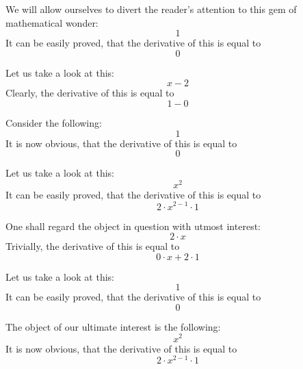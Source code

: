 \documentclass{article}
\begin{document}
We will allow ourselves to divert the reader's attention to this gem of mathematical wonder:
\begin{equation}
1 
\end{equation}
It can be easily proved, that the derivative of this is equal to
\begin{equation}
0 
\end{equation}

Let us take a look at this:
\begin{equation}
x - 2 
\end{equation}
Clearly, the derivative of this is equal to
\begin{equation}
1 - 0 
\end{equation}

Consider the following:
\begin{equation}
1 
\end{equation}
It is now obvious, that the derivative of this is equal to
\begin{equation}
0 
\end{equation}

Let us take a look at this:
\begin{equation}
x ^{2 } 
\end{equation}
It can be easily proved, that the derivative of this is equal to
\begin{equation}
2 \cdot x ^{2 - 1 } \cdot 1 
\end{equation}

One shall regard the object in question with utmost interest:
\begin{equation}
2 \cdot x 
\end{equation}
Trivially, the derivative of this is equal to
\begin{equation}
0 \cdot x + 2 \cdot 1 
\end{equation}

Let us take a look at this:
\begin{equation}
1 
\end{equation}
It can be easily proved, that the derivative of this is equal to
\begin{equation}
0 
\end{equation}

The object of our ultimate interest is the following:
\begin{equation}
x ^{2 } 
\end{equation}
It is now obvious, that the derivative of this is equal to
\begin{equation}
2 \cdot x ^{2 - 1 } \cdot 1 
\end{equation}
\end{document}
